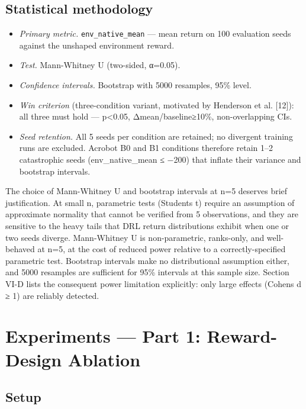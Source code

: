 \documentclass[conference,letterpaper,10pt]{IEEEtran}
\providecommand{\tightlist}{\setlength{\itemsep}{0pt}\setlength{\parskip}{0pt}}
\begin{document}
\subsection{Statistical methodology}

\begin{itemize}
\tightlist
\item
  \emph{Primary metric.} \texttt{env\_native\_mean} --- mean return on 100 evaluation seeds against the unshaped environment reward.
\item
  \emph{Test.} Mann-Whitney U (two-sided, α=0.05).
\item
  \emph{Confidence intervals.} Bootstrap with 5000 resamples, 95\% level.
\item
  \emph{Win criterion} (three-condition variant, motivated by Henderson et al. {[}12{]}): all three must hold --- p\textless0.05, \textbar Δmean\textbar/\textbar baseline\textbar≥10\%, non-overlapping CIs.
\item
  \emph{Seed retention.} All 5 seeds per condition are retained; no divergent training runs are excluded. Acrobot B0 and B1 conditions therefore retain 1--2 catastrophic seeds (env\_native\_mean ≤ −200) that inflate their variance and bootstrap intervals.
\end{itemize}

The choice of Mann-Whitney U and bootstrap intervals at n=5 deserves brief justification. At small n, parametric tests (Student\textquotesingle s t) require an assumption of approximate normality that cannot be verified from 5 observations, and they are sensitive to the heavy tails that DRL return distributions exhibit when one or two seeds diverge. Mann-Whitney U is non-parametric, ranks-only, and well-behaved at n=5, at the cost of reduced power relative to a correctly-specified parametric test. Bootstrap intervals make no distributional assumption either, and 5000 resamples are sufficient for 95\% intervals at this sample size. Section VI-D lists the consequent power limitation explicitly: only large effects (Cohen\textquotesingle s d ≥ 1) are reliably detected.


\section{Experiments --- Part 1: Reward-Design Ablation}

\subsection{Setup}
\end{document}
